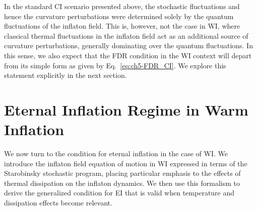 In the standard CI scenario presented above, the stochastic fluctuations and hence the curvature perturbations were determined solely by the quantum fluctuations of the inflaton field.
This is, however, not the case in WI, where classical thermal fluctuations in the inflaton field act as an additional source of
curvature perturbations, generally dominating over the quantum fluctuations. In this sense, we also expect that the FDR condition in
the WI context  will depart from its simple form as given by
Eq.~\ref{eq:ch5-FDR_CI}.  We explore this statement explicitly in the next section.


\section{Eternal Inflation Regime in Warm Inflation}
\label{sec:ch5-EIWI}

We now turn to the condition for eternal inflation in the case of WI. We introduce the inflaton field equation of motion in WI expressed in terms of the Starobinsky stochastic program, placing particular emphasis to the effects of thermal dissipation on the inflaton dynamics. We then use this formalism to derive the generalized condition for EI that is valid when temperature and dissipation effects become relevant.

